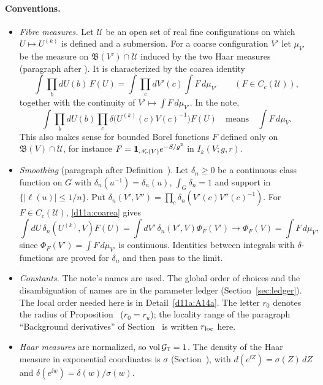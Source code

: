 \paragraph{Conventions.}
\begin{itemize}
\item \emph{Fibre measures.} Let $\mathcal U$ be an open set of real fine configurations on which $U\mapsto U^{(k)}$ is defined and a submersion. For a coarse configuration $V'$ let $\mu_{V'}$ be the measure on $\mathfrak B(V')\cap\mathcal U$ induced by the two Haar measures (paragraph after ). It is characterized by the coarea identity
\begin{equation}\label{d11a:coarea}
\int\prod_bdU(b)\,F(U)=\int\prod_cdV'(c)\int F\,d\mu_{V'}\qquad(F\in C_c(\mathcal U)),
\end{equation}
together with the continuity of $V'\mapsto\int F\,d\mu_{V'}$. In the note,
\[
\int\prod_bdU(b)\prod_c\delta\big(U^{(k)}(c)V(c)^{-1}\big)F(U)\quad\text{means}\quad\int F\,d\mu_V .
\] This also makes sense for bounded Borel functions $F$ defined only on $\mathfrak B(V)\cap\mathcal U$, for instance $F=\mathbf 1_{\mathscr N_r(V)}e^{-S/g^2}$ in $I_k(V;g,r)$.
\item \emph{Smoothing} (paragraph after Definition~). Let $\delta_n\ge0$ be a continuous class function on $G$ with $\delta_n(u^{-1})=\delta_n(u)$, $\int_G\delta_n=1$ and support in $\{|\ell(u)|\le1/n\}$. Put $\delta_n(V',V'')=\prod_c\delta_n(V'(c)V''(c)^{-1})$. For $F\in C_c(\mathcal U)$, \eqref{d11a:coarea} gives
\[
\int dU\,\delta_n(U^{(k)},V)F(U)=\int dV'\,\delta_n(V',V)\Phi_F(V')\longrightarrow\Phi_F(V)=\int F\,d\mu_V ,
\]
since $\Phi_F(V')=\int F\,d\mu_{V'}$ is continuous. Identities between integrals with $\delta$-functions are proved for $\delta_n$ and then pass to the limit.
\item \emph{Constants.} The note's names are used. The global order of choices and the disambiguation of names are in the parameter ledger (Section~\ref{sec:ledger}). The local order needed here is in Detail~\ref{d11a:A14a}. The letter $r_0$ denotes the radius of Proposition~ ($r_0=r_u$); the locality range of the paragraph ``Background derivatives'' of Section~ is written $r_{\rm loc}$ here.
\item \emph{Haar measures} are normalized, so $\operatorname{vol}\mathcal G_\mathbb T=1$. The density of the Haar measure in exponential coordinates is $\sigma$ (Section~), with $d(e^{\ii Z})=\sigma(Z)\,dZ$ and $\delta(e^{\ii w})=\delta(w)/\sigma(w)$.
\end{itemize}

